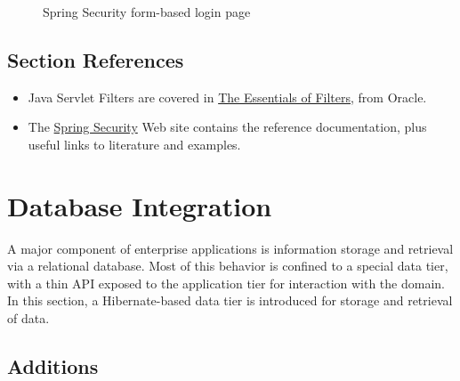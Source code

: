 \documentclass{article}
\begin{document}
\vspace{10pt}
\begin{figure}[H]
\begin{center}
\end{center}
\caption{Spring Security form-based login page}
\label{fig:security/login-page}
\end{figure}

\subsection{Section References}

\begin{itemize}
\item Java Servlet Filters are covered in \href{http://www.oracle.com/technetwork/java/filters-137243.html}{The Essentials of Filters}, from Oracle.
\item The \href{http://static.springsource.org/spring-security/site/}{Spring Security} Web site contains the reference documentation, plus useful links to literature and examples.
\end{itemize}

\pagebreak
\section{Database Integration}

A major component of enterprise applications is information storage and retrieval via a relational database.  Most of this behavior is confined to a special data tier, with a thin API exposed to the application tier for interaction with the domain.  In this section, a Hibernate-based data tier is introduced for storage and retrieval of data.

\subsection{Additions}
\end{document}
